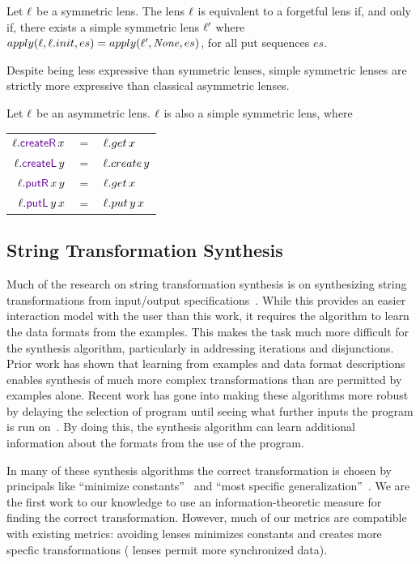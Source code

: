 \documentclass[acmsmall,screen,anonymous]{acmart}
\begin{document}
\begin{theorem}
  Let $\mathit{\ell}$ be a symmetric lens. The lens $\mathit{\ell}$ is equivalent to a forgetful
  lens if, and only if, there exists a simple symmetric lens $\mathit{\ell}'$ where
  $apply(\mathit{\ell},\mathit{\ell}.init,es) = apply(\mathit{\ell}',\mathit{None},es)$, for all put sequences $es$.
\end{theorem}

Despite being less expressive than symmetric lenses, simple symmetric lenses are
strictly more expressive than classical asymmetric lenses.

\begin{theorem}
  Let $\mathit{\ell}$ be an asymmetric lens. $\mathit{\ell}$ is also a simple symmetric lens,
  where
  \begin{center}
    \begin{tabular}{rcl}
      $\Lens.\CreateROf{x}$ & $=$ & $\mathit{\ell}.get \, x$\\
      $\Lens.\CreateLOf{y}$ & $=$ & $\mathit{\ell}.create \, y$\\
      $\Lens.\PutROf{x}{y}$ & $=$ & $\mathit{\ell}.get \, x$\\
      $\Lens.\PutLOf{y}{x}$ & $=$ & $\mathit{\ell}.put \, y \, x$
    \end{tabular}
  \end{center}
\end{theorem}

\subsection{String Transformation Synthesis}
Much of the research on string transformation synthesis is on synthesizing
string transformations from input/output
specifications~\cite{flashfill,flashextract,?}. While this provides an easier
interaction model with the user than this work, it requires the algorithm to
learn the data formats from the examples. This makes the task much more
difficult for the synthesis algorithm, particularly in addressing iterations and
disjunctions. Prior work has shown that learning from examples and data format
descriptions enables synthesis of much more complex transformations than are
permitted by examples alone. Recent work has gone into making these algorithms
more robust by delaying the selection of program until seeing what further
inputs the program is run on~\cite{?}. By doing this, the synthesis algorithm
can learn additional information about the formats from the use of the program.

In many of these synthesis algorithms the correct transformation is chosen by
principals like ``minimize constants''~\cite{?,?,?} and ``most specific
generalization''~\cite{?,?,?}. We are the first work to our knowledge to use an
information-theoretic measure for finding the correct transformation. However,
much of our metrics are compatible with existing metrics: avoiding \Disconnect
lenses minimizes constants and creates more specfic transformations (\Disconnect
lenses permit more synchronized data).
\end{document}
